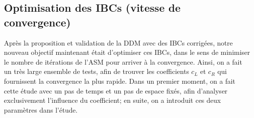 %
%
%
%
%
%

\subsection{Optimisation des IBCs (vitesse de convergence)}

\indent Après la proposition et validation de la DDM avec des IBCs corrigées, notre nouveau objectif maintenant était d'optimiser ces IBCs, dans le sens de minimiser le nombre de itérations de l'ASM pour arriver à la convergence. Ainsi, on a fait un très large ensemble de tests, afin de trouver les coefficients $c_L$ et $c_R$ qui fournissent la convergence la plus rapide. Dans un premier moment, on a fait cette étude avec un pas de temps et un pas de espace fixés, afin d'analyser exclusivement l'influence du coefficient; en suite, on a introduit ces deux paramètres dans l'étude.

